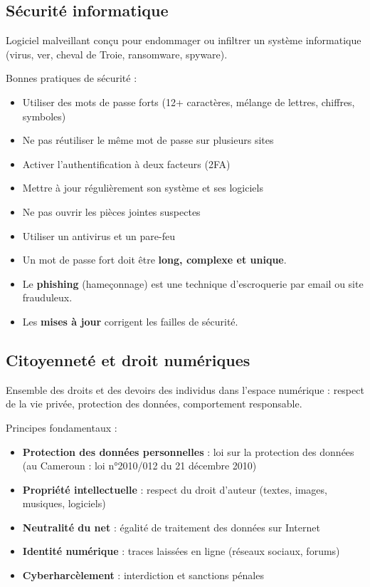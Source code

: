 \subsection{Sécurité informatique}
\begin{definition}[Malware]
Logiciel malveillant conçu pour endommager ou infiltrer un système informatique (virus, ver, cheval de Troie, ransomware, spyware).
\end{definition}

Bonnes pratiques de sécurité :
\begin{itemize}
    \item Utiliser des mots de passe forts (12+ caractères, mélange de lettres, chiffres, symboles)
    \item Ne pas réutiliser le même mot de passe sur plusieurs sites
    \item Activer l'authentification à deux facteurs (2FA)
    \item Mettre à jour régulièrement son système et ses logiciels
    \item Ne pas ouvrir les pièces jointes suspectes
    \item Utiliser un antivirus et un pare-feu
\end{itemize}

\begin{aretenir}
\begin{itemize}
    \item Un mot de passe fort doit être \textbf{long, complexe et unique}.
    \item Le \textbf{phishing} (hameçonnage) est une technique d'escroquerie par email ou site frauduleux.
    \item Les \textbf{mises à jour} corrigent les failles de sécurité.
\end{itemize}
\end{aretenir}

\subsection{Citoyenneté et droit numériques}
\begin{definition}
Ensemble des droits et des devoirs des individus dans l'espace numérique : respect de la vie privée, protection des données, comportement responsable.
\end{definition}

Principes fondamentaux :
\begin{itemize}
    \item \textbf{Protection des données personnelles} : loi sur la protection des données (au Cameroun : loi n°2010/012 du 21 décembre 2010)
    \item \textbf{Propriété intellectuelle} : respect du droit d'auteur (textes, images, musiques, logiciels)
    \item \textbf{Neutralité du net} : égalité de traitement des données sur Internet
    \item \textbf{Identité numérique} : traces laissées en ligne (réseaux sociaux, forums)
    \item \textbf{Cyberharcèlement} : interdiction et sanctions pénales
\end{itemize}

